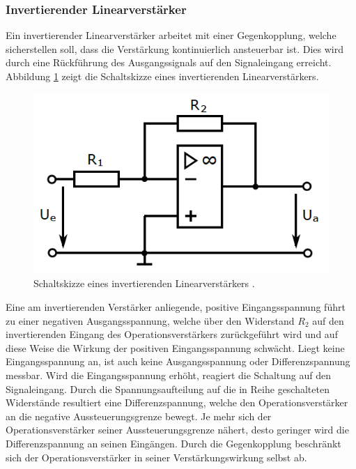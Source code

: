 \subsubsection{Invertierender Linearverstärker}
Ein invertierender Linearverstärker arbeitet mit einer Gegenkopplung, welche
sicherstellen soll, dass die Verstärkung kontinuierlich ansteuerbar ist. Dies wird durch eine
Rückführung des Ausgangssignals auf den Signaleingang erreicht. \\
Abbildung \ref{fig:03} zeigt die Schaltskizze eines invertierenden
Linearverstärkers. \\
\FloatBarrier
\begin{figure}
  \centering
  \includegraphics[scale=0.7]{ressources/figure_03.png}
  \caption{Schaltskizze eines invertierenden Linearverstärkers \cite{sample}.}
  \label{fig:03}
\end{figure}
\FloatBarrier
\noindent Eine am invertierenden Verstärker anliegende, positive Eingangsspannung
führt zu einer negativen Ausgangsspannung, welche über den Widerstand
$R_2$ auf den invertierenden Eingang des Operationsverstärkers zurückgeführt
wird und auf diese Weise die Wirkung der positiven Eingangsspannung schwächt.
Liegt keine Eingangsspannung an, ist auch keine Ausgangsspannung oder
Differenzspannung messbar. Wird die Eingangsspannung erhöht, reagiert die Schaltung
auf den Signaleingang. Durch die Spannungsaufteilung auf die in Reihe
geschalteten Widerstände resultiert eine Differenzspannung, welche den
Operationsverstärker an die negative Aussteuerungsgrenze bewegt. Je mehr sich
der Operationsverstärker seiner Aussteuerungsgrenze nähert, desto geringer wird
die Differenzspannung an seinen Eingängen. Durch die Gegenkopplung beschränkt sich
der Operationsverstärker in seiner Verstärkungswirkung selbst ab.
